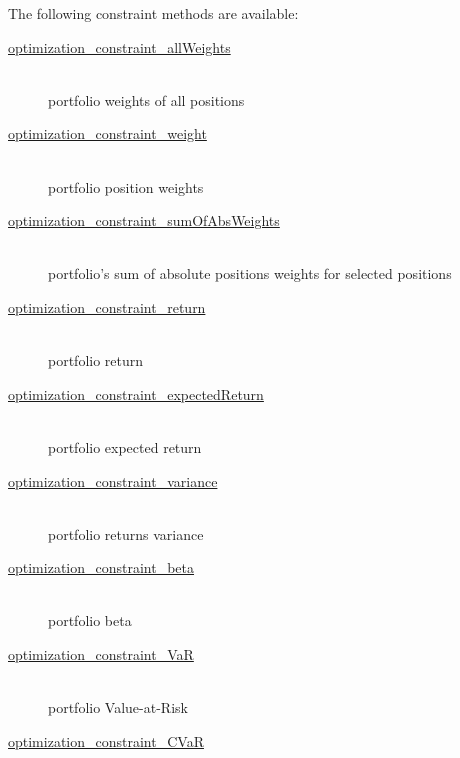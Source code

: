 \documentclass[letterpaper]{report}
\begin{document}
The following constraint methods are available:
			
\begin{description} 
\item[\href{https://www.portfolioeffect.com/docs/platform/quant/functions/optimization-functions/optimization-constraint-all-weights}{optimization\_constraint\_allWeights}]
\hfill \\
portfolio weights of all positions
\item[\href{https://www.portfolioeffect.com/docs/platform/quant/functions/optimization-functions/optimization-constraint-weight}{optimization\_constraint\_weight}]
\hfill \\
portfolio position weights
\item[\href{https://www.portfolioeffect.com/docs/platform/quant/functions/optimization-functions/optimization-constraint-sum-of-abs-weights}{optimization\_constraint\_sumOfAbsWeights}]
\hfill \\
portfolio's sum of absolute positions weights for selected positions
\item[\href{https://www.portfolioeffect.com/docs/docs/platform/quant/functions/optimization-functions/optimization-constraint-return}{optimization\_constraint\_return}]
\hfill \\
portfolio return
\item[\href{https://www.portfolioeffect.com/docs/platform/quant/functions/optimization-functions/optimization-constraint-expected-return}{optimization\_constraint\_expectedReturn}]
\hfill \\
portfolio expected return
\item[\href{https://www.portfolioeffect.com/docs/platform/quant/functions/optimization-functions/optimization-constraint-variance}{optimization\_constraint\_variance}]
\hfill \\
portfolio returns variance
\item[\href{https://www.portfolioeffect.com/docs/platform/quant/functions/optimization-functions/optimization-constraint-beta}{optimization\_constraint\_beta}]
\hfill \\
portfolio beta
\item[\href{https://www.portfolioeffect.com/docs/platform/quant/functions/optimization-functions/optimization-constraint-var}{optimization\_constraint\_VaR}]
\hfill \\
portfolio Value-at-Risk
\item[\href{https://www.portfolioeffect.com/docs/platform/quant/functions/optimization-functions/optimization-constraint-cvar}{optimization\_constraint\_CVaR}]

\end{description}
\end{document}
